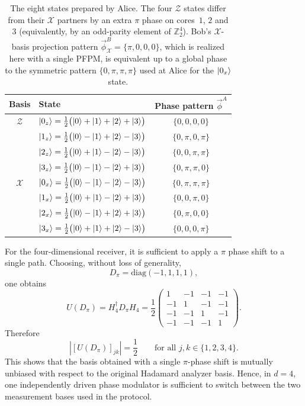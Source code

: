 \documentclass[pra,aps,reprint,nofootinbib,superscriptaddress,floatfix]{revtex4-2}
\begin{document}
 \begin{table}[t]
\centering
\caption{The eight states prepared by Alice. The four $\mathcal{Z}$ states differ from their $\mathcal{X}$ partners by an extra $\pi$ phase on cores~$1$, $2$ and $3$ (equivalently, by an odd-parity element of $\mathbb{Z}_2^4$). Bob's $\mathcal{X}$-basis projection pattern $\vec{\phi}^B_{\mathcal{X}}=\{\pi,0,0,0\}$, which is realized here with a single PFPM, is equivalent up to a global phase to the symmetric pattern $\{0,\pi,\pi,\pi\}$ used at Alice for the $\ket{0_x}$ state.}
\label{tab:states}
\renewcommand{\arraystretch}{1.25}
\begin{tabular}{c l c}
\toprule
Basis & State & Phase pattern $\vec{\phi}^A$ \\
\midrule
$\mathcal{Z}$ & $\ket{0_z}=\tfrac{1}{2}\bigl(\ket{0}+\ket{1}+\ket{2}+\ket{3}\bigr)$ & $\{0,0,0,0\}$ \\
              & $\ket{1_z}=\tfrac{1}{2}\bigl(\ket{0}-\ket{1}+\ket{2}-\ket{3}\bigr)$ & $\{0,\pi,0,\pi\}$ \\
              & $\ket{2_z}=\tfrac{1}{2}\bigl(\ket{0}+\ket{1}-\ket{2}-\ket{3}\bigr)$ & $\{0,0,\pi,\pi\}$ \\
              & $\ket{3_z}=\tfrac{1}{2}\bigl(\ket{0}-\ket{1}-\ket{2}+\ket{3}\bigr)$ & $\{0,\pi,\pi,0\}$ \\
\midrule
$\mathcal{X}$ & $\ket{0_x}=\tfrac{1}{2}\bigl(\ket{0}-\ket{1}-\ket{2}-\ket{3}\bigr)$ & $\{0,\pi,\pi,\pi\}$ \\
              & $\ket{1_x}=\tfrac{1}{2}\bigl(\ket{0}+\ket{1}-\ket{2}+\ket{3}\bigr)$ & $\{0,0,\pi,0\}$ \\
              & $\ket{2_x}=\tfrac{1}{2}\bigl(\ket{0}-\ket{1}+\ket{2}+\ket{3}\bigr)$ & $\{0,\pi,0,0\}$ \\
              & $\ket{3_x}=\tfrac{1}{2}\bigl(\ket{0}+\ket{1}+\ket{2}-\ket{3}\bigr)$ & $\{0,0,0,\pi\}$ \\
\bottomrule
\end{tabular}
\end{table}

For the four-dimensional receiver, it is sufficient to apply a \(\pi\) phase shift to a single path. Choosing, without loss of generality,
\[
D_\pi=\mathrm{diag}(-1,1,1,1),
\]
one obtains
\[
U(D_\pi)
=H_4^\dagger D_\pi H_4
=
\frac{1}{2}
\begin{pmatrix}
1&-1&-1&-1\\
-1&1&-1&-1\\
-1&-1&1&-1\\
-1&-1&-1&1
\end{pmatrix}.
\]
Therefore
\[
\left|[U(D_\pi)]_{jk}\right|=\frac{1}{2}
\qquad
\text{for all } j,k\in\{1,2,3,4\}.
\]
This shows that the basis obtained with a single \(\pi\)-phase shift is mutually unbiased with respect to the original Hadamard analyzer basis. Hence, in \(d=4\), one independently driven phase modulator is sufficient to switch between the two measurement bases used in the protocol.
\end{document}
